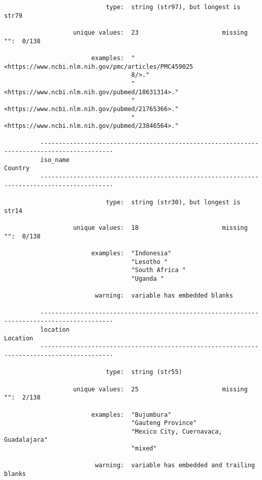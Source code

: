 \documentclass{article}
\begin{document}
\begin{verbatim}
                            type:  string (str97), but longest is str79
          
                   unique values:  23                       missing "":  0/138
          
                        examples:  "<https://www.ncbi.nlm.nih.gov/pmc/articles/PMC459025
                                   8/>."
                                   "<https://www.ncbi.nlm.nih.gov/pubmed/18631314>."
                                   "<https://www.ncbi.nlm.nih.gov/pubmed/21765366>."
                                   "<https://www.ncbi.nlm.nih.gov/pubmed/23846564>."
          
          ------------------------------------------------------------------------------------------
          iso_name                                                                           Country
          ------------------------------------------------------------------------------------------
          
                            type:  string (str30), but longest is str14
          
                   unique values:  18                       missing "":  0/138
          
                        examples:  "Indonesia"
                                   "Lesotho "
                                   "South Africa "
                                   "Uganda "
          
                         warning:  variable has embedded blanks
          
          ------------------------------------------------------------------------------------------
          location                                                                          Location
          ------------------------------------------------------------------------------------------
          
                            type:  string (str55)
          
                   unique values:  25                       missing "":  2/138
          
                        examples:  "Bujumbura"
                                   "Gauteng Province"
                                   "Mexico City, Cuernavaca, Guadalajara"
                                   "mixed"
          
                         warning:  variable has embedded and trailing blanks
          

\end{verbatim}
\end{document}
